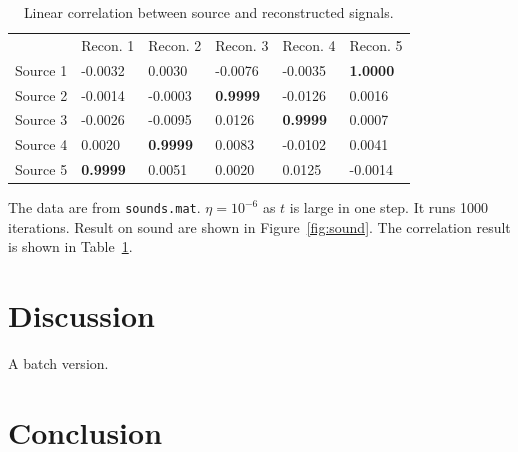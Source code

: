 \documentclass[10pt]{article}
\begin{document}
\begin{table}[h]
\centering
\begin{tabular}{ | l l l l l l | }
\hline
& Recon. 1& Recon. 2& Recon. 3& Recon. 4& Recon. 5\\
Source 1 &-0.0032& 0.0030&-0.0076&-0.0035& \textbf{1.0000}\\
Source 2 &-0.0014&-0.0003& \textbf{0.9999}&-0.0126& 0.0016\\
Source 3 &-0.0026&-0.0095& 0.0126& \textbf{0.9999}& 0.0007\\
Source 4 &0.0020& \textbf{0.9999}& 0.0083&-0.0102& 0.0041\\
Source 5 &\textbf{0.9999}& 0.0051& 0.0020& 0.0125&-0.0014\\
\hline
\end{tabular}
\caption{Linear correlation between source and reconstructed signals.}
\label{tbl:corrs}
\end{table}

The data are from \texttt{sounds.mat}. $\eta = 10 ^ {-6}$ as $t$ is large
in one step. It runs 1000 iterations. Result on sound are shown in
Figure~\ref{fig:sound}. The correlation result is shown in
Table~\ref{tbl:corrs}.

\section{Discussion}

A batch version.

\section{Conclusion}
\end{document}
